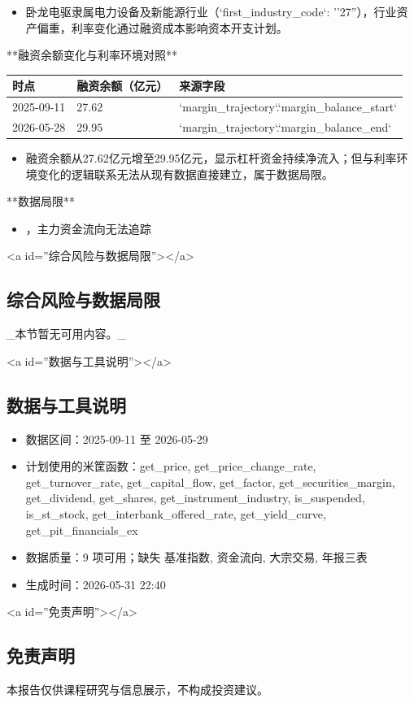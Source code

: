 \documentclass[12pt,a4paper]{article}
\begin{document}
\begin{itemize}
\item 卧龙电驱隶属电力设备及新能源行业（`first\_industry\_code`: ''27''），行业资产偏重，利率变化通过融资成本影响资本开支计划。
\end{itemize}

**融资余额变化与利率环境对照**

\begin{table}[htbp]
\centering
\begin{tabular}{lll}
\toprule
时点 & 融资余额（亿元） & 来源字段 \\
\midrule
2025-09-11 & 27.62 & `margin\_trajectory`.`margin\_balance\_start` \\
2026-05-28 & 29.95 & `margin\_trajectory`.`margin\_balance\_end` \\
\bottomrule
\end{tabular}
\end{table}


\begin{itemize}
\item 融资余额从27.62亿元增至29.95亿元，显示杠杆资金持续净流入；但与利率环境变化的逻辑联系无法从现有数据直接建立，属于数据局限。
\end{itemize}

**数据局限**

\begin{itemize}
\item ，主力资金流向无法追踪
\end{itemize}

<a id=''综合风险与数据局限''></a>

\subsection{ 综合风险与数据局限}

\_本节暂无可用内容。\_

<a id=''数据与工具说明''></a>

\subsection{ 数据与工具说明}
\begin{itemize}
\item 数据区间：2025-09-11 至 2026-05-29
\item 计划使用的米筐函数：get\_price, get\_price\_change\_rate, get\_turnover\_rate, get\_capital\_flow, get\_factor, get\_securities\_margin, get\_dividend, get\_shares, get\_instrument\_industry, is\_suspended, is\_st\_stock, get\_interbank\_offered\_rate, get\_yield\_curve, get\_pit\_financials\_ex
\item 数据质量：9 项可用；缺失 基准指数, 资金流向, 大宗交易, 年报三表
\item 生成时间：2026-05-31 22:40
\end{itemize}

<a id=''免责声明''></a>

\subsection{ 免责声明}
本报告仅供课程研究与信息展示，不构成投资建议。
\end{document}
